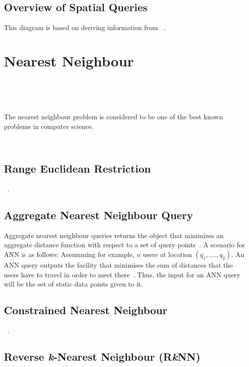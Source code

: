 \documentclass[a4paper,11pt]{article}
\begin{document}
\subsection{Overview of Spatial Queries}

This diagram is based on deriving information from ~\cite{taniar2013taxonomy}.

\section{Nearest Neighbour}

~\cite{jensen2003nearest}

~\cite{preparatat1985computational}

The nearest neighbour problem is considered to be one of the best known problems in computer science. 

~\cite{roussopoulos1995nearest}

\subsection{Range Euclidean Restriction}

~\cite{papadias2003query}. 

\subsection{Aggregate Nearest Neighbour Query}

Aggregate nearest neighbour queries returns the object that minimizes an aggregate distance function with respect to a set of query points~\cite{yiu2005aggregate}. A scenario for ANN is as follows: Assumming for example, $n$ users at location $(q_1,....,q_2)$. An ANN query outputs the facility that minimises the sum of distances that the users have to travel in order to meet there~\cite{papadias2005aggregate}. Thus, the input for an ANN query will be the set of static data points given to it.

\subsection{Constrained Nearest Neighbour}

~\cite{ferhatosmanoglu2001constrained}.

\subsection{Reverse \textit{k}-Nearest Neighbour (R\textit{k}NN)}
\end{document}
